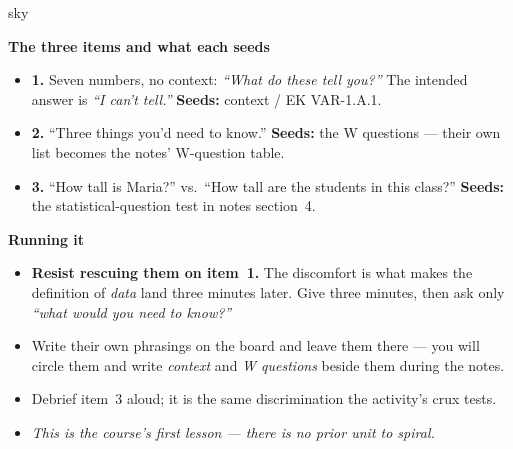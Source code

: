 \documentclass[10pt]{article}
\begin{document}
\boxguard[20]
\begin{skillbox}{sky}
\begin{minipage}[t]{0.48\linewidth}
    \textbf{The three items and what each seeds}
    \begin{itemize}
        \item \textbf{1.} Seven numbers, no context: \emph{``What do these tell you?''} The
              intended answer is \emph{``I can't tell.''} \textbf{Seeds:} context / EK VAR-1.A.1.
        \item \textbf{2.} ``Three things you'd need to know.'' \textbf{Seeds:} the W questions ---
              their own list becomes the notes' W-question table.
        \item \textbf{3.} ``How tall is Maria?'' vs.\ ``How tall are the students in this class?''
              \textbf{Seeds:} the statistical-question test in notes section~4.
    \end{itemize}
\end{minipage}
\hfill
\begin{minipage}[t]{0.48\linewidth}
    \textbf{Running it}
    \begin{itemize}
        \item \textbf{Resist rescuing them on item~1.} The discomfort is what makes the
              definition of \emph{data} land three minutes later. Give three minutes, then ask
              only \emph{``what would you need to know?''}
        \item Write their own phrasings on the board and leave them there --- you will circle
              them and write \emph{context} and \emph{W questions} beside them during the notes.
        \item Debrief item~3 aloud; it is the same discrimination the activity's crux tests.
        \item \emph{This is the course's first lesson --- there is no prior unit to spiral.}
    \end{itemize}
\end{minipage}
\end{skillbox}
\end{document}
